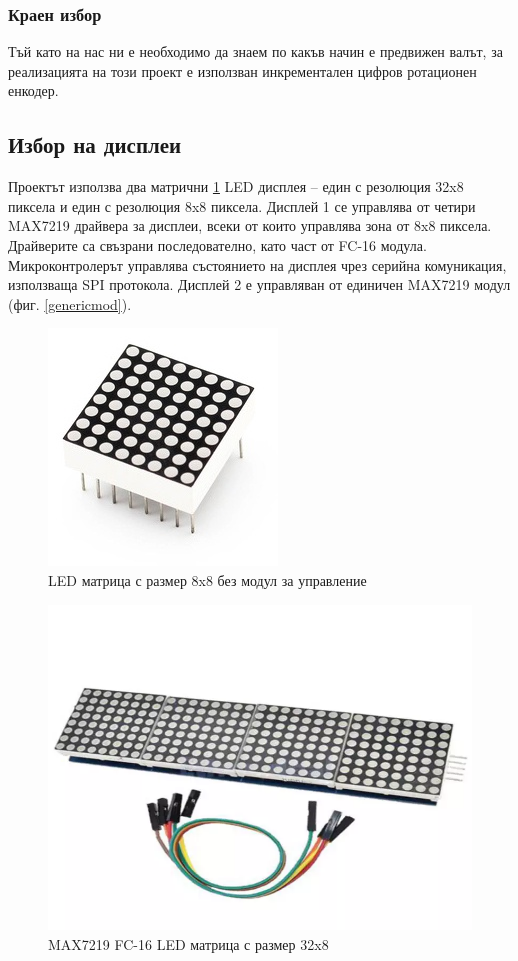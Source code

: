 \documentclass[titlepage, oneside, 14pt]{extbook}
\begin{document}
\subsubsection*{Краен избор}

Тъй като на нас ни е необходимо да знаем по какъв начин е предвижен валът, за
реализацията на този проект е използван инкрементален цифров ротационен
енкодер.

\subsection{Избор на дисплеи}

Проектът използва два матрични \ref{matrix} LED дисплея -- един с резолюция 32x8 пиксела и един с резолюция 8x8 пиксела.
Дисплей 1 се управлява от четири MAX7219 \cite{displaytut} драйвера за дисплеи, всеки от които управлява зона
от 8x8 пиксела. Драйверите са свъзрани последователно, като част от FC-16
модула. Микроконтролерът управлява състоянието на дисплея чрез серийна комуникация,
използваща SPI протокола. Дисплей 2 е управляван от единичен MAX7219 модул (фиг. \ref{genericmod}).

\begin{figure}[!htbp]
    \centering
    \includegraphics[width=0.5\linewidth]{img/display_matrix.jpg}
    \caption{LED матрица с размер 8x8 без модул за управление}
    \label{matrix}
\end{figure}

\begin{figure}[!htbp]
    \centering
    \includegraphics[width=0.5\linewidth]{img/display.png}
    \caption{MAX7219 FC-16 LED матрица с размер 32x8}
\end{figure}
\end{document}
